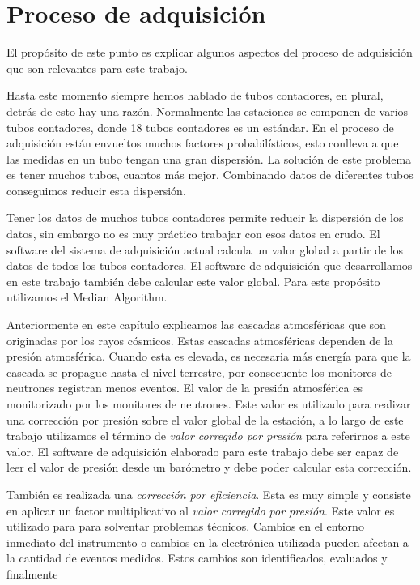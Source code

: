 \section{Proceso de adquisición}
	El propósito de este punto es explicar algunos aspectos del proceso de adquisición que son relevantes para este trabajo.
	\par
	Hasta este momento siempre hemos hablado de tubos contadores, en plural, detrás de esto hay una razón. Normalmente las estaciones se componen
	de varios tubos contadores, donde 18 tubos contadores es un estándar. En el proceso de adquisición están envueltos muchos factores
	probabilísticos, esto conlleva a que las medidas en un tubo tengan una gran dispersión. La solución de este problema es tener muchos tubos,
	cuantos más mejor. Combinando datos de diferentes tubos conseguimos reducir esta dispersión. 
	\par
	Tener los datos de muchos tubos contadores permite reducir la dispersión de los datos, sin embargo no es muy práctico trabajar con esos datos
	en crudo. El software del sistema de adquisición actual calcula un valor global a partir de los datos de todos los tubos contadores. El
	software de adquisición que desarrollamos en este trabajo también debe calcular este valor global.  Para este propósito utilizamos el Median
	Algorithm\cite{MedianAlgr}.
	\par
	Anteriormente en este capítulo explicamos las cascadas atmosféricas que son originadas por los rayos cósmicos. Estas cascadas atmosféricas
	dependen de la presión atmosférica. Cuando esta es elevada, es necesaria más energía para que la cascada se propague hasta el nivel terrestre,
	por consecuente los monitores de neutrones registran menos eventos. El valor de la presión atmosférica es monitorizado por los monitores de
	neutrones. Este valor es utilizado para realizar una corrección por presión sobre el valor global de la estación, a lo largo de este trabajo
	utilizamos el término de \emph{valor corregido por presión} para referirnos a este valor. El software de adquisición elaborado para este
	trabajo debe ser capaz de leer el valor de presión desde un barómetro y debe poder calcular esta corrección. 
	\par
	También es realizada una \emph{corrección por eficiencia}. Esta es muy simple y consiste en aplicar un factor multiplicativo al \emph{valor
	corregido por presión}. Este valor es utilizado para para solventar problemas técnicos. Cambios en el entorno inmediato del instrumento o
	cambios en la electrónica utilizada pueden afectan a la cantidad de eventos medidos. Estos cambios son identificados, evaluados y finalmente
